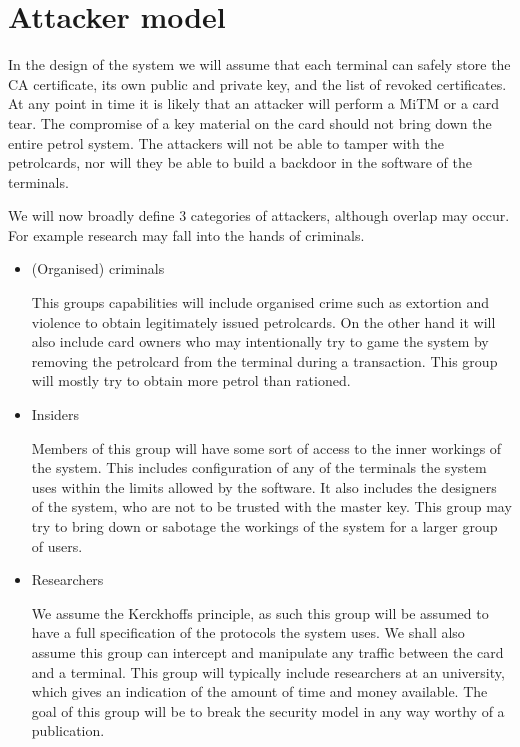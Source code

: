 \section{Attacker model}
In the design of the system we will assume that each terminal can safely store the CA certificate, its own public and private key, and the list of revoked certificates. At any point in time it is likely that an attacker will perform a MiTM or a card tear. The compromise of a key material on the card should not bring down the entire petrol system. The attackers will not be able to tamper with the petrolcards, nor will they be able to build a backdoor in the software of the terminals.

We will now broadly define $3$ categories of attackers, although overlap may occur. For example research may fall into the hands of criminals. 

\begin{itemize}

\item (Organised) criminals

This groups capabilities will include organised crime such as extortion and violence to obtain legitimately issued petrolcards. On the other hand it will also include card owners who may intentionally try to game the system by removing the petrolcard from the terminal during a transaction. This group will mostly try to obtain more petrol than rationed.

\item Insiders

Members of this group will have some sort of access to the inner workings of the system. This includes configuration of any of the terminals the system uses within the limits allowed by the software. It also includes the designers of the system, who are not to be trusted with the master key. This group may try to bring down or sabotage the workings of the system for a larger group of users.

\item Researchers

We assume the Kerckhoffs principle, as such this group will be assumed to have a full specification of the protocols the system uses. We shall also assume this group can intercept and manipulate any traffic between the card and a terminal. This group will typically include researchers at an university, which gives an indication of the amount of time and money available. The goal of this group will be to break the security model in any way worthy of a publication.
 
\end{itemize}